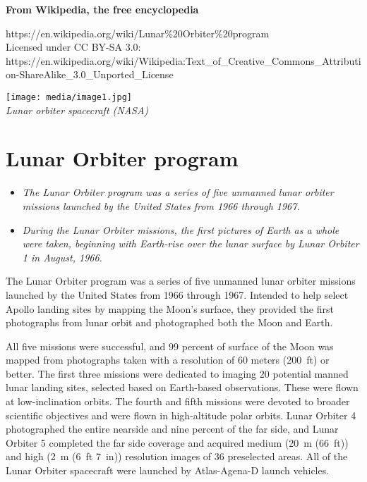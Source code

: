 \textbf{From Wikipedia, the free encyclopedia}

https://en.wikipedia.org/wiki/Lunar\%20Orbiter\%20program\\
Licensed under CC BY-SA 3.0:\\
https://en.wikipedia.org/wiki/Wikipedia:Text\_of\_Creative\_Commons\_Attribution-ShareAlike\_3.0\_Unported\_License

\texttt{[image: media/image1.jpg]}\\
\emph{Lunar orbiter spacecraft (NASA)}

\section{Lunar Orbiter program}\label{lunar-orbiter-program}

\begin{itemize}
\item
  \emph{The Lunar Orbiter program was a series of five unmanned lunar
  orbiter missions launched by the United States from 1966 through
  1967.}
\item
  \emph{During the Lunar Orbiter missions, the first pictures of Earth
  as a whole were taken, beginning with Earth-rise over the lunar
  surface by Lunar Orbiter 1 in August, 1966.}
\end{itemize}

The Lunar Orbiter program was a series of five unmanned lunar orbiter
missions launched by the United States from 1966 through 1967. Intended
to help select Apollo landing sites by mapping the Moon's surface, they
provided the first photographs from lunar orbit and photographed both
the Moon and Earth.

All five missions were successful, and 99 percent of surface of the Moon
was mapped from photographs taken with a resolution of 60 meters
(200~ft) or better. The first three missions were dedicated to imaging
20 potential manned lunar landing sites, selected based on Earth-based
observations. These were flown at low-inclination orbits. The fourth and
fifth missions were devoted to broader scientific objectives and were
flown in high-altitude polar orbits. Lunar Orbiter 4 photographed the
entire nearside and nine percent of the far side, and Lunar Orbiter 5
completed the far side coverage and acquired medium (20~m (66~ft)) and
high (2~m (6~ft 7~in)) resolution images of 36 preselected areas. All of
the Lunar Orbiter spacecraft were launched by Atlas-Agena-D launch
vehicles.

